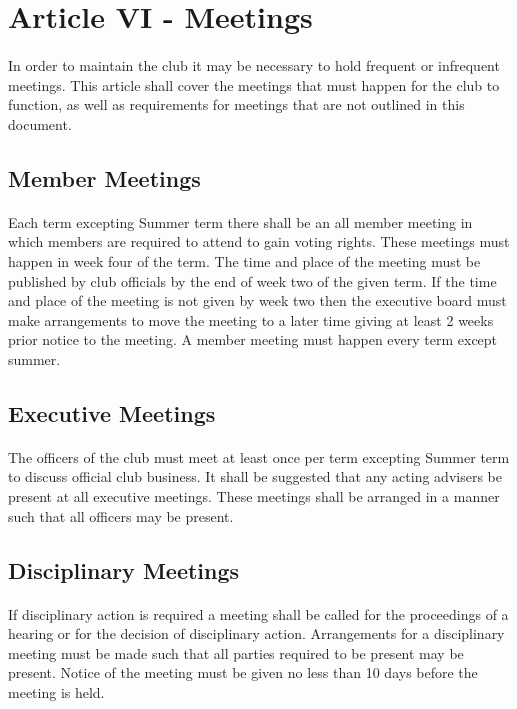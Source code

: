 \documentclass[12pt]{article}
\newcommand{\article}[1]{
\setcounter{section}{0}
\setcounter{subsection}{0}

	\section*{#1}
	\addcontentsline{toc}{section}{#1}
	
}
\begin{document}
\article{Article VI - Meetings}
\paragraph{}
In order to maintain the club it may be necessary to hold frequent or infrequent meetings. This article shall cover the meetings that must happen for the club to function, as well as requirements for meetings that are not outlined in this document.

\subsection{Member Meetings}
\paragraph{}
Each term excepting Summer term there shall be an all member meeting in which members are required to attend to gain voting rights. 
These meetings must happen in week four of the term. 
The time and place of the meeting must be published by club officials by the end of week two of the given term. 
If the time and place of the meeting is not given by week two then the executive board must make 
arrangements to move the meeting to a later time giving at least 2 weeks prior notice to the meeting.
A member meeting must happen every term except summer.

\subsection{Executive Meetings}
\paragraph{}
The officers of the club must meet at least once per term excepting Summer term to discuss official club business.
It shall be suggested that any acting advisers be present at all executive meetings. 
These meetings shall be arranged in a manner such that all officers may be present.

\subsection{Disciplinary Meetings}
\paragraph{}
If disciplinary action is required a meeting shall be called for the proceedings of a hearing
or for the decision of disciplinary action. Arrangements for a disciplinary meeting must be
made such that all parties required to be present may be present. Notice of the meeting must
be given no less than 10 days before the meeting is held. 
\end{document}
